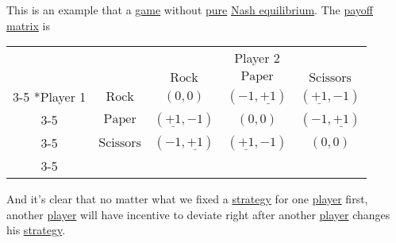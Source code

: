 \begin{eg}\label{eg:rock-paper-scissors}
	This is an example that a \hyperref[def:game]{game} without \hyperref[def:pure-strategy]{pure} \hyperref[def:Nash-equilibrium]{Nash equilibrium}. The \hyperref[def:payoff-matrix]{payoff matrix} is
	\begin{table}[H]
		\centering
		\setlength{\extrarowheight}{2pt}
		\begin{tabular}{cc|c|c|c|}
			                        & \multicolumn{1}{c}{} & \multicolumn{3}{c}{Player 2}                                                                                   \\
			                        & \multicolumn{1}{c}{} & \multicolumn{1}{c}{$\text{Rock}$} & \multicolumn{1}{c}{$\text{Paper}$} & \multicolumn{1}{c}{$\text{Scissors}$} \\\cline{3-5}
			\multirow{3}*{Player 1} & $\text{Rock}$        & $(0, 0)$                          & $(-1, \underline{+1})$             & $(\underline{+1}, -1)$                \\\cline{3-5}
			                        & $\text{Paper}$       & $(\underline{+1}, -1)$            & $(0, 0)$                           & $(-1, \underline{+1})$                \\\cline{3-5}
			                        & $\text{Scissors}$    & $(-1, \underline{+1})$            & $(\underline{+1}, -1)$             & $(0, 0)$                              \\\cline{3-5}
		\end{tabular}
	\end{table}
	And it's clear that no matter what we fixed a \hyperref[def:strategy]{strategy} for one \hyperref[def:player]{player} first, another \hyperref[def:player]{player} will have incentive to deviate right after another \hyperref[def:player]{player} changes his \hyperref[def:strategy]{strategy}.
\end{eg}

